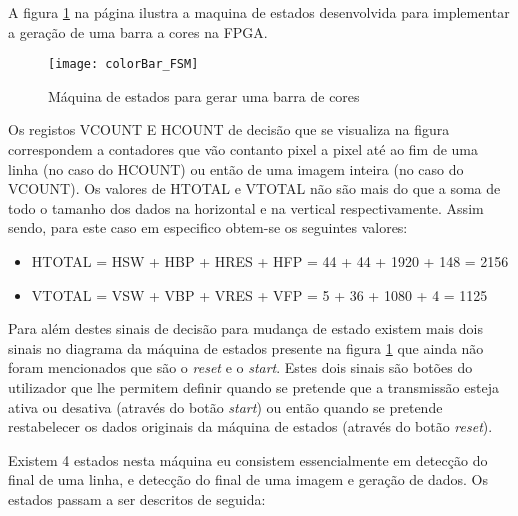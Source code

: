A figura \ref{fig:colorBar_fsm} na página \pageref{fig:colorBar_fsm} ilustra a maquina de estados desenvolvida para implementar a geração de uma barra a cores na FPGA. 

\begin{figure}[h!]
	\begin{center}
		\leavevmode
		\texttt{[image: colorBar\_FSM]}
		\caption{Máquina de estados para gerar uma barra de cores}
		\label{fig:colorBar_fsm}
	\end{center}
\end{figure}

Os registos VCOUNT E HCOUNT de decisão que se visualiza na figura correspondem a contadores que vão contanto pixel a pixel até ao fim de uma linha (no caso do HCOUNT) ou então de uma imagem inteira (no caso do VCOUNT). Os valores de HTOTAL e VTOTAL não são mais do que a soma de todo o tamanho dos dados na horizontal e na vertical respectivamente. Assim sendo, para este caso em especifico obtem-se os seguintes valores:
\begin{itemize}
	\item HTOTAL = HSW + HBP + HRES + HFP = 44 + 44 + 1920 + 148 = 2156
	\item VTOTAL = VSW + VBP + VRES + VFP = 5 + 36 + 1080 + 4 = 1125
\end{itemize}

Para além destes sinais de decisão para mudança de estado existem mais dois sinais no diagrama da máquina de estados presente na figura \ref{fig:colorBar_fsm} que ainda não foram mencionados que são o \textit{reset} e o \textit{start}. Estes dois sinais são botões do utilizador que lhe permitem definir quando se pretende que a transmissão esteja ativa ou desativa (através do botão \textit{start}) ou então quando se pretende restabelecer os dados originais da máquina de estados (através do botão \textit{reset}). 


Existem 4 estados nesta máquina eu consistem essencialmente em detecção do final de uma linha, e detecção do final de uma imagem e geração de dados. Os estados passam a ser descritos de seguida:

